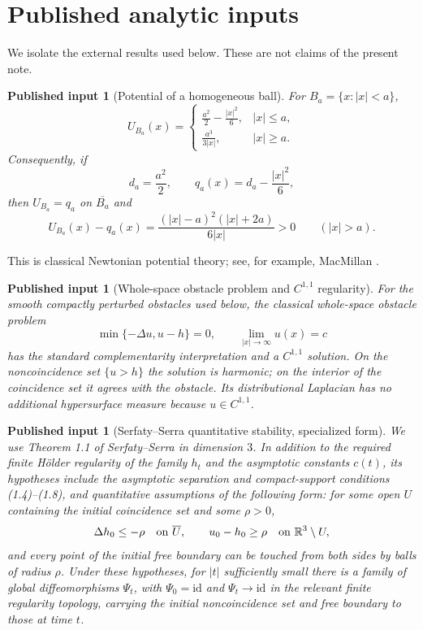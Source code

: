 \documentclass[11pt]{article}
\newtheorem{external}[theorem]{Published input}
\theoremstyle{definition}
\theoremstyle{remark}
\newcommand{\R}{\mathbb{R}}
\newcommand{\lap}{\Delta}
\newcommand{\1}{\mathbf{1}}
\begin{document}
\section{Published analytic inputs}

We isolate the external results used below. These are not claims of the present note.

\begin{external}[Potential of a homogeneous ball]\label{ext:ball}
For $B_a=\{x:|x|<a\}$,
\begin{equation}\label{eq:ballpotential}
U_{B_a}(x)=
\begin{cases}
\displaystyle \frac{a^2}{2}-\frac{|x|^2}{6},& |x|\le a,\\[6pt]
\displaystyle \frac{a^3}{3|x|},& |x|\ge a.
\end{cases}
\end{equation}
Consequently, if
\[
 d_a=\frac{a^2}{2},\qquad q_a(x)=d_a-\frac{|x|^2}{6},
\]
then $U_{B_a}=q_a$ on $\overline{B_a}$ and
\begin{equation}\label{eq:positivegap}
 U_{B_a}(x)-q_a(x)
 =\frac{(|x|-a)^2(|x|+2a)}{6|x|}>0
 \qquad(|x|>a).
\end{equation}
\end{external}

This is classical Newtonian potential theory; see, for example, MacMillan \cite{MacMillan}.

\begin{external}[Whole-space obstacle problem and $C^{1,1}$ regularity]\label{ext:obstacle}
For the smooth compactly perturbed obstacles used below, the classical whole-space obstacle problem
\[
 \min\{-\lap u,u-h\}=0,
 \qquad
 \lim_{|x|\to\infty}u(x)=c
\]
has the standard complementarity interpretation and a $C^{1,1}$ solution. On the noncoincidence set $\{u>h\}$ the solution is harmonic; on the interior of the coincidence set it agrees with the obstacle. Its distributional Laplacian has no additional hypersurface measure because $u\in C^{1,1}$.
\end{external}

\begin{external}[Serfaty--Serra quantitative stability, specialized form]\label{ext:ss}
We use Theorem 1.1 of Serfaty--Serra \cite{SerfatySerra} in dimension $3$. In addition to the required finite H\"older regularity of the family $h_t$ and the asymptotic constants $c(t)$, its hypotheses include the asymptotic separation and compact-support conditions (1.4)--(1.8), and quantitative assumptions of the following form: for some open $U$ containing the initial coincidence set and some $\rho>0$,
\begin{equation}\label{eq:ssquant}
 \lap h_0\le-\rho\quad\hbox{on }\overline U,
 \qquad
 u_0-h_0\ge\rho\quad\hbox{on }\R^3\setminus U,
\end{equation}
and every point of the initial free boundary can be touched from both sides by balls of radius $\rho$.
Under these hypotheses, for $|t|$ sufficiently small there is a family of global diffeomorphisms $\Psi_t$, with $\Psi_0=\mathrm{id}$ and $\Psi_t\to\mathrm{id}$ in the relevant finite regularity topology, carrying the initial noncoincidence set and free boundary to those at time $t$.
\end{external}
\end{document}
